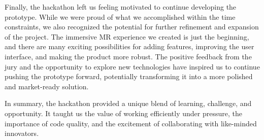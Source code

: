\documentclass[12pt]{article}
\begin{document}
Finally, the hackathon left us feeling motivated to continue developing the prototype. While we were proud of what we accomplished within the time constraints, we also recognized the potential for further refinement and expansion of the project. The immersive MR experience we created is just the beginning, and there are many exciting possibilities for adding features, improving the user interface, and making the product more robust. The positive feedback from the jury and the opportunity to explore new technologies have inspired us to continue pushing the prototype forward, potentially transforming it into a more polished and market-ready solution.

In summary, the hackathon provided a unique blend of learning, challenge, and opportunity. It taught us the value of working efficiently under pressure, the importance of code quality, and the excitement of collaborating with like-minded innovators. 
\end{document}
